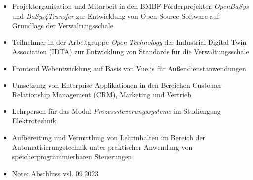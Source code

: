 \documentclass[10pt,a4paper,ragged2e,withhyper]{altacv}
\begin{document}
\begin{paracol}{2}
            \begin{itemize}
                \item Projektorganisation und Mitarbeit in den BMBF-Förderprojekten \textit{OpenBaSys}\\ und \textit{BaSys4Transfer} zur Entwicklung von Open-Source-Software auf Grundlage der Verwaltungsschale
                \item Teilnehmer in der Arbeitgruppe \textit{Open Technology} der Industrial Digital Twin Association (IDTA) zur Entwicklung von Standards für die Verwaltungsschale
            \end{itemize}
            \divider
            
            \begin{itemize}
                \item Frontend Webentwicklung auf Basis von Vue.js für Außendienstanwendungen
                \item Umsetzung von Enterprise-Applikationen in den Bereichen Customer Relationship Management (CRM), Marketing und Vertrieb
            \end{itemize}
            \divider

            \begin{itemize}
                \item Lehrperson für das Modul \textit{Prozesssteuerungssysteme} im Studiengang Elektrotechnik
                \item Aufbereitung und Vermittlung von Lehrinhalten im Bereich der Automatisierungstechnik unter praktischer Anwendung von speicherprogrammierbaren Steuerungen
            \end{itemize}
        
            \begin{itemize}
                \item Note: Abschluss vsl. 09 2023
            \end{itemize}
            \divider
            

\end{paracol}
\end{document}

